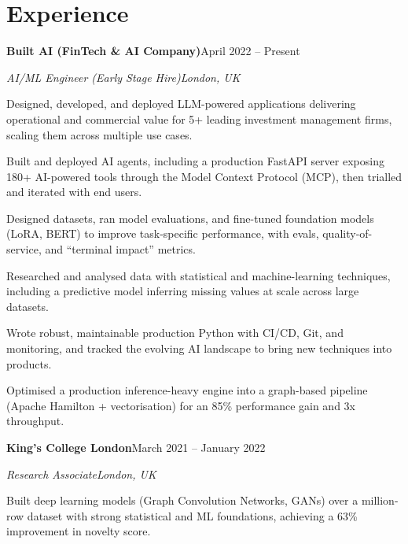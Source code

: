 \documentclass[10pt,a4paper]{article}
\newcommand{\entry}[4]{%
  {\color{company}\bfseries #1}\hfill {\color{muted}#2}\par
  \vspace{1pt}
  {\itshape #3}\hfill {\color{muted}\itshape #4}\par
  \vspace{3pt}%
}
\begin{document}
\section{Experience}
\entry{Built AI (FinTech \& AI Company)}{April 2022 -- Present}{AI/ML Engineer (Early Stage Hire)}{London, UK}
\begin{tight}
  \item Designed, developed, and deployed LLM-powered applications delivering operational and commercial value for 5+ leading investment management firms, scaling them across multiple use cases.
  \item Built and deployed AI agents, including a production FastAPI server exposing 180+ AI-powered tools through the Model Context Protocol (MCP), then trialled and iterated with end users.
  \item Designed datasets, ran model evaluations, and fine-tuned foundation models (LoRA, BERT) to improve task-specific performance, with evals, quality-of-service, and ``terminal impact'' metrics.
  \item Researched and analysed data with statistical and machine-learning techniques, including a predictive model inferring missing values at scale across large datasets.
  \item Wrote robust, maintainable production Python with CI/CD, Git, and monitoring, and tracked the evolving AI landscape to bring new techniques into products.
  \item Optimised a production inference-heavy engine into a graph-based pipeline (Apache Hamilton + vectorisation) for an 85\% performance gain and 3x throughput.
\end{tight}

\entry{King's College London}{March 2021 -- January 2022}{Research Associate}{London, UK}
\begin{tight}
  \item Built deep learning models (Graph Convolution Networks, GANs) over a million-row dataset with strong statistical and ML foundations, achieving a 63\% improvement in novelty score.
\end{tight}

\end{document}
